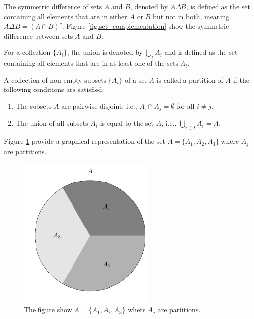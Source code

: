 \begin{definition}
	The symmetric difference of sets $A$ and $B$, denoted by $A \Delta B$, is defined as the set containing all elements that are in either $A$ or $B$ but not in both, meaning $A \Delta B = (A \cap B)^c$. Figure \ref{fig:set_complementation} show the symmetric difference between sets $A$ and $B$.
\end{definition}

\begin{definition}
	For a collection $\{A_i\}$, the union is denoted by $\bigcup_{i} A_i$ and is defined as the set containing all elements that are in at least one of the sets $A_i$.
\end{definition}

\begin{definition}[Partition]
	A collection of non-empty subsets $\{A_i\}$ of a set $A$ is called a partition of $A$ if the following conditions are satisfied:
	\begin{enumerate}
		\item The subsets $A$ are pairwise disjoint, i.e., $A_i \cap A_j = \emptyset$ for all \(i \neq j\).
		\item The union of all subsets \(A_i\) is equal to the set \(A\), i.e., \(\bigcup_{i \in I} A_i = A\).
	\end{enumerate}
	
	Figure \ref{fig:set_partition} provide a graphical representation of the set $A=\{A_1,A_2,A_3\}$ where $A_j$ are partitions.
	\begin{figure}[h]
		\centering
		\includegraphics[width = 0.6\textwidth]{figures/set_partition.pdf}
		\caption{The figure show $A=\{A_1,A_2,A_3\}$ where $A_j$ are partitions.}
		\label{fig:set_partition}
	\end{figure}
\end{definition}



